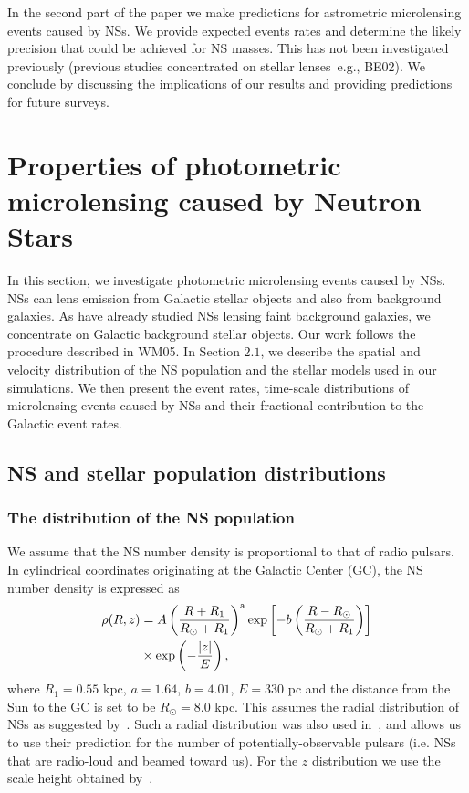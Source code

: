 \documentclass[iop,apj]{emulateapj}
\begin{document}
In the second part of the paper we make predictions for astrometric microlensing 
events caused by NSs. We provide expected events rates and determine the likely precision 
that could be achieved for NS masses. This has not been investigated previously (previous 
studies concentrated on stellar lenses~e.g., BE02). We conclude by discussing 
the implications of our results and providing predictions for future surveys.


\section{Properties of photometric microlensing caused by Neutron Stars}

In this section, we investigate photometric microlensing events caused by NSs. 
NSs can lens emission from Galactic stellar objects and also from background galaxies.  
As \citet{Tian} have already studied NSs lensing faint background galaxies, we 
concentrate on Galactic background stellar objects. Our work follows the 
procedure described in WM05. 
%
In Section $2.1$, we describe the spatial and velocity 
distribution of the NS population and the stellar models used in 
our simulations.
%
We then present the event rates, time-scale distributions of microlensing
events caused by NSs and their fractional contribution to the Galactic event
rates.
%

\subsection{NS and stellar population distributions}


\subsubsection{The distribution of the NS population}

We assume that the NS number density is proportional to that of radio pulsars.
%
In cylindrical coordinates originating at the Galactic Center (GC), the NS 
number density is expressed as
%
\begin{equation}
\begin{split}
\rho(R,z) & =A\left(\frac{R+R_{1}}{R_{\odot}+R_{1}}\right)^{\rm{a}}\exp\left[-b\left(\frac{R-R_{\odot}}{R_{\odot}+R_{1}}\right)\right]\\
          & \times\exp\left(-\frac{|z|}{E}\right),
\end{split}
\end{equation}
%
where $R_{1}=0.55$ kpc, $a=1.64$, $b=4.01$, $E=330$ pc and the distance from the
Sun to the GC is set to be $R_{\odot}=8.0$ kpc.
%
This assumes the radial distribution of NSs as suggested by~\citet{Yusifov}. Such a 
radial distribution was also used in~\citet{Faucher}, and allows us to use their 
prediction for the number of potentially-observable pulsars (i.e. NSs that are 
radio-loud and beamed toward us). For the $z$ distribution we use the scale height 
obtained by~\citet{Lorimer06}.
%
\end{document}
